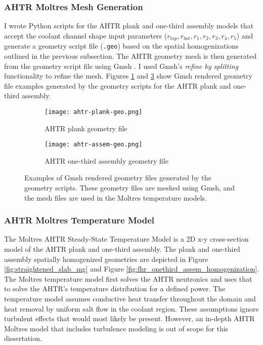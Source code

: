 \subsubsection{AHTR Moltres Mesh Generation}
I wrote Python scripts for the \gls{AHTR} plank and one-third assembly models 
that accept the coolant channel shape input parameters 
($r_{top}, r_{bot}, r_1, r_2, r_3, r_4, r_5$) and generate a geometry script file 
(\texttt{.geo}) based on the spatial homogenizations outlined in the previous 
subsection.
The AHTR geometry mesh is then generated from the geometry script file using 
Gmsh \cite{geuzaine_gmsh_2009}.
I used Gmsh's \textit{refine by splitting} functionality to refine the mesh. 
Figures \ref{fig:ahtr-plank-geo} and \ref{fig:ahtr-assem-geo} show Gmsh rendered 
geometry file examples generated by the geometry scripts for the AHTR plank 
and one-third assembly.
\begin{figure}[htbp]
    \centering
    \begin{subfigure}{\textwidth}
        \texttt{[image: ahtr-plank-geo.png]}
        \caption{AHTR plank geometry file}
        \label{fig:ahtr-plank-geo} 
    \end{subfigure}
    \begin{subfigure}{\textwidth}
        \texttt{[image: ahtr-assem-geo.png]}
        \caption{AHTR one-third assembly geometry file}
        \label{fig:ahtr-assem-geo} 
    \end{subfigure}
    \caption{Examples of Gmsh rendered geometry files generated by the geometry scripts.
    These geometry files are meshed using Gmsh, and the mesh files are used in the Moltres 
    temperature models.}
\end{figure}

\subsubsection{AHTR Moltres Temperature Model}
\label{sec:ahtr-moltres-temperature-model}
The Moltres \gls{AHTR} Steady-State Temperature Model is a 2D x-y cross-section 
model of the \gls{AHTR} plank and one-third assembly.
The plank and one-third assembly spatially homogenized geometries are depicted in
Figure \ref{fig:straightened_slab_mg} and Figure 
\ref{fig:fhr_onethird_assem_homogenization}.  
The Moltres temperature model first solves the \gls{AHTR} neutronics and uses that to 
solve the \gls{AHTR}'s temperature distribution for a defined power.
The temperature model assumes conductive heat transfer throughout the domain 
and heat removal by uniform salt flow in the coolant region. 
These assumptions ignore turbulent effects that would most likely be present. 
However, an in-depth AHTR Moltres model that includes turbulence modeling is 
out of scope for this dissertation. 

